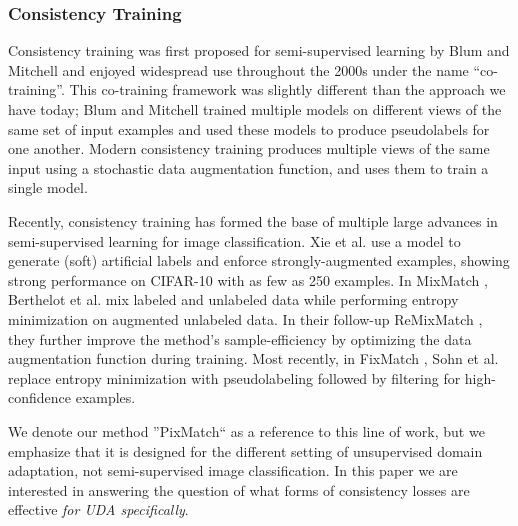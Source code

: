 \documentclass[final]{cvpr}
\begin{document}
\subsubsection{Consistency Training}

Consistency training was first proposed for semi-supervised learning by Blum and Mitchell \cite{cotraining} and enjoyed widespread use throughout the 2000s under the name ``co-training''. This co-training framework was slightly different than the approach we have today; Blum and Mitchell \cite{cotraining} trained multiple models on different views of the same set of input examples and used these models to produce pseudolabels for one another. Modern consistency training \cite{sajjadi2016regularization} produces multiple views of the same input using a stochastic data augmentation function, and uses them to train a single model. 

Recently, consistency training has formed the base of multiple large advances in semi-supervised learning for image classification. Xie et al. \cite{xie2019unsupervised} use a model to generate (soft) artificial labels and enforce strongly-augmented examples, showing strong performance on CIFAR-10 with as few as 250 examples. In MixMatch \cite{berthelot2019mixmatch}, Berthelot et al. mix labeled and unlabeled data while performing entropy minimization on augmented unlabeled data. In their follow-up ReMixMatch \cite{berthelot2019remixmatch}, they further improve the method's sample-efficiency by optimizing the data augmentation function during training. Most recently, in FixMatch \cite{fixmatch}, Sohn et al. replace entropy minimization with pseudolabeling followed by filtering for high-confidence examples. 

We denote our method ''PixMatch`` as a reference to this line of work, but we emphasize that it is designed for the different setting of unsupervised domain adaptation, not semi-supervised image classification. In this paper we are interested in answering the question of what forms of consistency losses are effective \textit{for UDA specifically}. 

\end{document}
